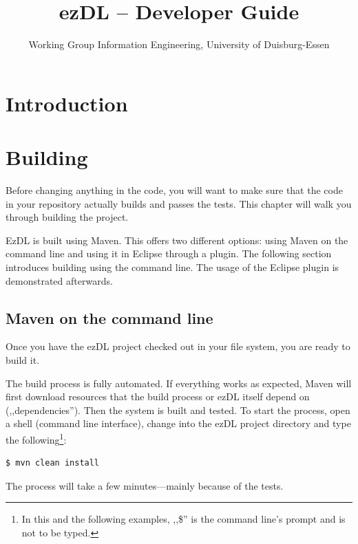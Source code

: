 \documentclass[12pt]{book}
\title{ezDL -- Developer Guide}
\author{Working Group Information Engineering, University of Duisburg-Essen}
\date{}
\begin{document}
  \maketitle 
  
\tableofcontents  

  
%
%
%
%
%
\chapter{Introduction}



%
%
%
%
%
\chapter{Building}

Before changing anything in the code, you will want to make sure that the code in your repository actually builds and passes the tests. This chapter will walk you through building the project.

EzDL is built using Maven. This offers two different options: using Maven on the command line and using it in Eclipse through a plugin. The following section introduces building using the command line. The usage of the Eclipse plugin is demonstrated afterwards.


\section{Maven on the command line}

Once you have the ezDL project checked out in your file system, you are ready to build it.

The build process is fully automated. If everything works as expected, Maven will first download resources that the build process or ezDL itself depend on (,,dependencies''). Then the system is built and tested. To start the process, open a shell (command line interface), change into the ezDL project directory and type the following\footnote{In this and the following examples, ,,\$'' is the command line's prompt and is not to be typed.}:

\begin{verbatim}
$ mvn clean install
\end{verbatim}

The process will take a few minutes---mainly because of the tests.
\end{document}
